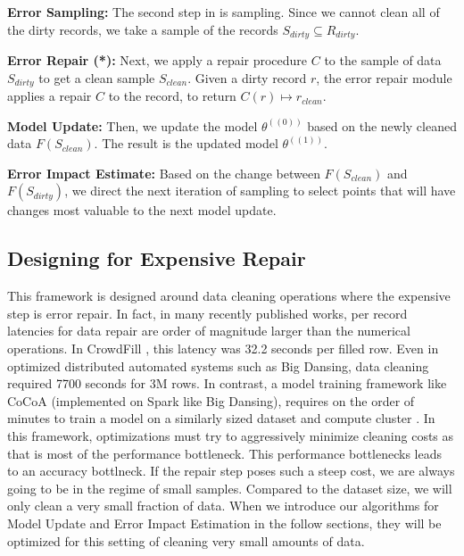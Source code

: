 \vspace{0.5em}

\noindent\textbf{Error Sampling: } The second step in \sys is sampling. Since we cannot clean all of the dirty records, we take a sample of the records $S_{dirty} \subseteq R_{dirty}$.

\vspace{0.5em}

\noindent\textbf{Error Repair (*): } Next, we apply a repair procedure $C$ to the sample of data $S_{dirty}$ to get a clean sample $S_{clean}$. Given a dirty record $r$, the error repair module applies a repair $C$ to the record, to return $C(r)\mapsto r_{clean}$. 

\vspace{0.5em}

\noindent\textbf{Model Update: } Then, we update the model $\theta^({(0)})$ based on the newly cleaned data $F(S_{clean})$. The result is the updated model $\theta^({(1)})$.

\vspace{0.5em}

\noindent\textbf{Error Impact Estimate: } Based on the change between $F(S_{clean})$ and $F(S_{dirty})$, we direct the next iteration of sampling to select points that will have changes most valuable to the next model update.

\subsection{Designing for Expensive Repair}
This framework is designed around data cleaning operations where the expensive step is error repair.
In fact, in many recently published works, per record latencies for data repair are order of magnitude larger than the numerical operations.
In CrowdFill \cite{park2014crowdfill}, this latency was 32.2 seconds per filled row.
Even in optimized distributed automated systems such as Big Dansing, data cleaning required 7700 seconds for 3M rows.
In contrast, a model training framework like CoCoA (implemented on Spark like Big Dansing), requires on the order of minutes to train a model on a similarly sized dataset and compute cluster \cite{jaggi2014communication}.
In this framework, optimizations must try to aggressively minimize cleaning costs as that is most of the performance bottleneck.
This performance bottlenecks leads to an accuracy bottlneck.
If the repair step poses such a steep cost, we are always going to be in the regime of small samples.
Compared to the dataset size, we will only clean a very small fraction of data.
When we introduce our algorithms for Model Update and Error Impact Estimation in the follow sections, they will be optimized for this setting of cleaning very small amounts of data.

